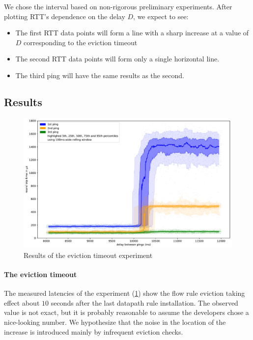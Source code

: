We chose the interval based on non-rigorous preliminary experiments. After plotting RTT's dependence on the delay $D$, we expect to see:

\begin{itemize}
    \item The first RTT data points will form a line with a sharp increase at a value of $D$ corresponding to the eviction timeout

    \item The second RTT data points will form only a single horizontal line.

    \item The third ping will have the same results as the second.
\end{itemize}

\subsection{Results}
\label{res:eviction-timeout}

\begin{figure}
    \centering
    \includegraphics[width=.9\linewidth]{img/randomized_eviction_timeout.pdf}
    \caption{Results of the eviction timeout experiment}
    \label{fig:plot-eviction-timeout}
\end{figure}

\paragraph{The eviction timeout} The measured latencies of the experiment (\cref{fig:plot-eviction-timeout}) show the flow rule eviction taking effect about $10$ seconds after the last datapath rule installation. The observed value is not exact, but it is probably reasonable to assume the developers chose a nice-looking number. We hypothesize that the noise in the location of the increase is introduced mainly by infrequent eviction checks.

